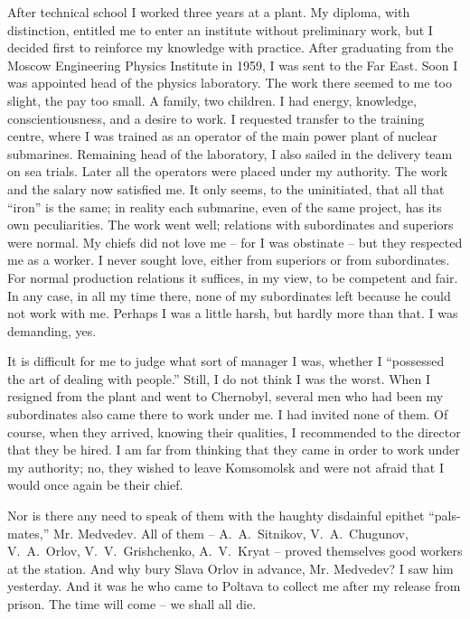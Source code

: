 \documentclass[openright]{bookest}
\begin{document}
After technical school I worked three years at a plant. My diploma, with distinction, entitled me to enter an institute without preliminary work, but I decided first to reinforce my knowledge with practice. After graduating from the Moscow Engineering Physics Institute in 1959, I was sent to the Far East. Soon I was appointed head of the physics laboratory. The work there seemed to me too slight, the pay too small. A family, two children. I had energy, knowledge, conscientiousness, and a desire to work. I requested transfer to the training centre, where I was trained as an operator of the main power plant of nuclear submarines. Remaining head of the laboratory, I also sailed in the delivery team on sea trials. Later all the operators were placed under my authority. The work and the salary now satisfied me. It only seems, to the uninitiated, that all that ``iron'' is the same; in reality each submarine, even of the same project, has its own peculiarities. The work went well; relations with subordinates and superiors were normal. My chiefs did not love me -- for I was obstinate -- but they respected me as a worker. I never sought love, either from superiors or from subordinates. For normal production relations it suffices, in my view, to be competent and fair. In any case, in all my time there, none of my subordinates left because he could not work with me. Perhaps I was a little harsh, but hardly more than that. I was demanding, yes.

It is difficult for me to judge what sort of manager I was, whether I ``possessed the art of dealing with people.'' Still, I do not think I was the worst. When I resigned from the plant and went to Chernobyl, several men who had been my subordinates also came there to work under me. I had invited none of them. Of course, when they arrived, knowing their qualities, I recommended to the director that they be hired. I am far from thinking that they came in order to work under my authority; no, they wished to leave Komsomolsk and were not afraid that I would once again be their chief.

Nor is there any need to speak of them with the haughty disdainful epithet ``pals-mates,'' Mr. Medvedev. All of them -- A.~A.~Sitnikov, V.~A.~Chugunov, V.~A.~Orlov, V.~V.~Grishchenko, A.~V.~Kryat -- proved themselves good workers at the station. And why bury Slava Orlov in advance, Mr. Medvedev? I saw him yesterday. And it was he who came to Poltava to collect me after my release from prison. The time will come -- we shall all die.
\end{document}
